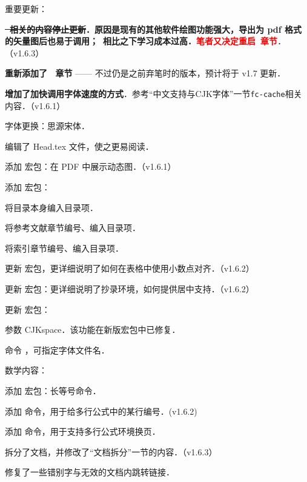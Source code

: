 \begin{feai}
\item 重要更新：
  \begin{feai}
  \item \textbf{\sout{\tikzz\  相关的内容停止更新}．原因是现有的其他软件绘图功能强大，导出为 pdf 格式的矢量图后也易于调用；\tikzz\  相比之下学习成本过高．}\textcolor{red}{\textbf{笔者又决定重启\tikzz\ 章节}}．（v1.6.3）
  \item \textbf{重新添加了 \tikzz\  章节} —— 不过仍是之前弃笔时的版本，预计将于 v1.7 更新．
  \item \textbf{增加了加快\xelatex 调用字体速度的方式}．参考“中文支持与CJK字体”一节\texttt{fc-cache}相关内容．（v1.6.1）
  \end{feai}
\item 字体更换：思源宋体．
\item 编辑了 Head.tex 文件，使之更易阅读．
\item [添加]宏包：在 PDF 中展示动态图．（v1.6.1）
\item [添加]宏包：
  \begin{feai}
  \item 将目录本身编入目录项．
  \item 将参考文献章节编号、编入目录项．
  \item 将索引章节编号、编入目录项．
  \end{feai}
\item [更新]宏包，更详细说明了如何在表格中使用小数点对齐．（v1.6.2）
\item [更新]宏包：更详细说明了抄录环境，如何提供居中支持．（v1.6.2）
\item [更新]宏包：
  \begin{feai}
  \item 参数 CJKspace．该功能在新版宏包中已修复．
  \item 命令 ，可指定字体文件名．
  \end{feai}
\item 数学内容：
  \begin{feai}
  \item [添加]宏包：长等号命令．
  \item [添加]命令，用于给多行公式中的某行编号．(v1.6.2)
  \item [添加]命令，用于支持多行公式环境换页．
  \end{feai}
\item 拆分了文档，并修改了“文档拆分”一节的内容．（v1.6.3）
\item 修复了一些错别字与无效的文档内跳转链接．
\end{feai}

